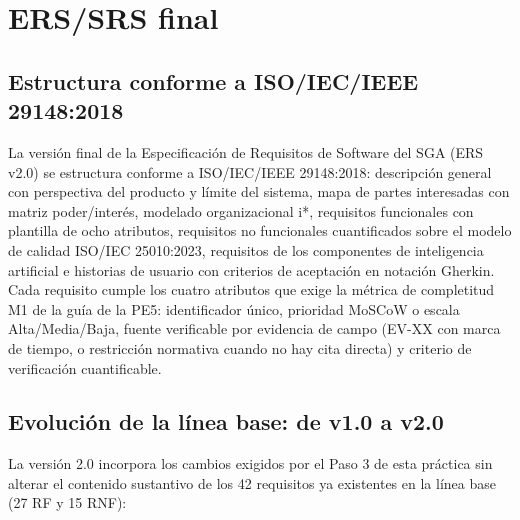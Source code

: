\section{ERS/SRS final}
\label{sec:informe-ers}

\subsection{Estructura conforme a ISO/IEC/IEEE 29148:2018}

La versión final de la Especificación de Requisitos de Software del SGA (ERS v2.0) se estructura conforme a ISO/IEC/IEEE 29148:2018: descripción general con perspectiva del producto y límite del sistema, mapa de partes interesadas con matriz poder/interés, modelado organizacional i*, requisitos funcionales con plantilla de ocho atributos, requisitos no funcionales cuantificados sobre el modelo de calidad ISO/IEC 25010:2023, requisitos de los componentes de inteligencia artificial e historias de usuario con criterios de aceptación en notación Gherkin. Cada requisito cumple los cuatro atributos que exige la métrica de completitud M1 de la guía de la PE5: identificador único, prioridad MoSCoW o escala Alta/Media/Baja, fuente verificable por evidencia de campo (EV-XX con marca de tiempo, o restricción normativa cuando no hay cita directa) y criterio de verificación cuantificable.

\subsection{Evolución de la línea base: de v1.0 a v2.0}

La versión 2.0 incorpora los cambios exigidos por el Paso 3 de esta práctica sin alterar el contenido sustantivo de los 42 requisitos ya existentes en la línea base (27 RF y 15 RNF):

